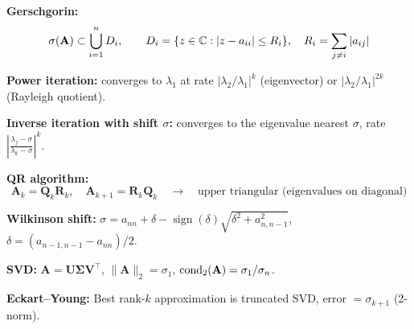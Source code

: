\begin{keyformulas}
\textbf{Gerschgorin:}
\[
    \sigma(\mathbf{A}) \subset \bigcup_{i=1}^n D_i, \qquad D_i = \{z \in \mathbb{C} : |z - a_{ii}| \leq R_i\}, \quad R_i = \sum_{j \neq i} |a_{ij}|
\]

\textbf{Power iteration:} converges to $\lambda_1$ at rate $|\lambda_2/\lambda_1|^k$ (eigenvector) or $|\lambda_2/\lambda_1|^{2k}$ (Rayleigh quotient).

\textbf{Inverse iteration with shift $\sigma$:} converges to the eigenvalue nearest $\sigma$, rate $\left|\frac{\lambda_j - \sigma}{\lambda_k - \sigma}\right|^k$.

\textbf{QR algorithm:}
\[
    \mathbf{A}_k = \mathbf{Q}_k\mathbf{R}_k, \quad \mathbf{A}_{k+1} = \mathbf{R}_k\mathbf{Q}_k \quad \to \quad \text{upper triangular (eigenvalues on diagonal)}
\]

\textbf{Wilkinson shift:} $\sigma = a_{nn} + \delta - \operatorname{sign}(\delta)\sqrt{\delta^2 + a_{n,n-1}^2}$, $\delta = (a_{n-1,n-1} - a_{nn})/2$.

\textbf{SVD:} $\mathbf{A} = \mathbf{U}\boldsymbol{\Sigma}\mathbf{V}^\top$, \quad $\|\mathbf{A}\|_2 = \sigma_1$, \quad $\mathrm{cond}_2(\mathbf{A}) = \sigma_1/\sigma_n$.

\textbf{Eckart--Young:} Best rank-$k$ approximation is truncated SVD, error $= \sigma_{k+1}$ (2-norm).
\end{keyformulas}
